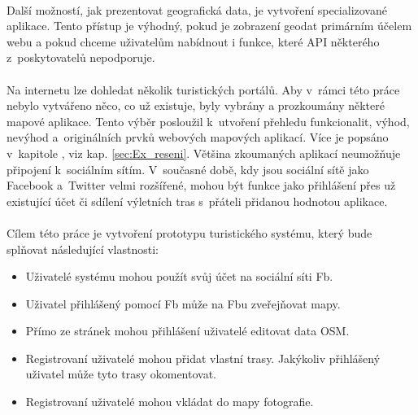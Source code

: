 \documentclass[11pt,a4paper,titlepage,oneside]{book}
\begin{document}
	\paragraph{}Další možností, jak prezentovat geografická data, je vytvoření specializované aplikace. Tento přístup je výhodný, pokud je zobrazení geodat primárním účelem webu a pokud chceme uživatelům nabídnout i funkce, které \ac{API} některého z~poskytovatelů nepodporuje. 




	\paragraph{} Na internetu lze dohledat několik turistických portálů. Aby v~rámci této práce nebylo vytvářeno něco, co už existuje, byly vybrány a prozkoumány některé mapové aplikace. Tento výběr posloužil k~utvoření přehledu funkcionalit, výhod, nevýhod a~originálních prvků webových mapových aplikací. Více je popsáno v~kapitole , viz kap. \ref{sec:Ex_reseni}. Většina zkoumaných aplikací neumožňuje připojení k~sociálním sítím. V~současné době, kdy jsou sociální sítě jako Facebook a~Twitter velmi rozšířené, mohou být funkce jako přihlášení přes už existující účet či sdílení výletních tras s~přáteli přidanou hodnotou aplikace. 



	\paragraph{} Cílem této práce je vytvoření prototypu turistického systému, který bude splňovat následující vlastnosti:
		\begin{itemize}
			\item Uživatelé systému mohou použít svůj účet na sociální síti \ac{Fb}.
			\item Uživatel přihlášený pomocí \ac{Fb} může na \acl{Fb}u zveřejňovat mapy.
			\item Přímo ze stránek mohou přihlášení uživatelé editovat data \ac{OSM}.
			\item Registrovaní uživatelé mohou přidat vlastní trasy. Jakýkoliv přihlášený uživatel může tyto trasy okomentovat.
			\item Registrovaní uživatelé mohou vkládat do mapy fotografie.
		\end{itemize}
\end{document}
